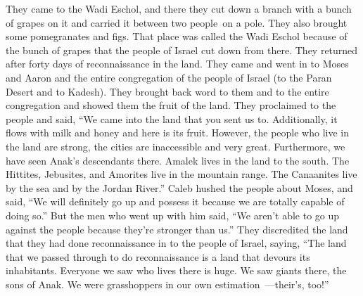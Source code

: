 \begin{inparaenum}
   They came to the Wadi Eschol, and there they cut down a branch with a bunch of grapes on it and carried it between two people\understood{}\ on a pole. They also brought some pomegranates and figs.%
   That place was called the Wadi Eschol because of the bunch of grapes that the people of Israel cut down from there.%
   They returned after forty days of reconnaissance in the land.%
   They came and went in to Moses and Aaron and the entire congregation of the people of Israel (to the Paran Desert and to Kadesh). They brought back word to them and to the entire congregation and showed them the fruit of the land.%
   They proclaimed to the people and said, ``We came into the land that you sent us to. Additionally, it flows with milk and honey and here is its fruit.%
   However, the people who live in the land are strong, the cities are inaccessible and very great. Furthermore, we have seen Anak's descendants there.%
   Amalek lives in the land to the south. The Hittites, Jebusites, and Amorites live in the mountain range. The Canaanites live by the sea and by the Jordan River.''\understood{}%
   Caleb hushed the people about Moses, and said, ``We will definitely go up and possess it because we are totally capable of doing so.''%
   But the men who went up with him said, ``We aren't able to go up against the people because they're stronger than us.''%
   They discredited the land that they had done reconnaissance in to the people of Israel, saying, ``The land that we passed through to do reconnaissance is a land that devours its inhabitants. Everyone we saw who lives there is huge.%
   We saw giants there, the sons of Anak. We were grasshoppers in our own estimation~---their's, too!''%
\end{inparaenum}
